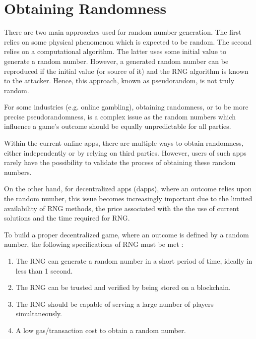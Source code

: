 \documentclass[12pt]{article}
\begin{document}

\newpage
\vspace{\baselineskip}\section{Obtaining Randomness}
\label{Obtaining Randomness}   \par

There are two main approaches used for random number generation. The first relies on some physical phenomenon which is expected to be random. The second relies on a computational algorithm. The latter uses some initial value to generate a random number. However, a generated random number can be reproduced if the initial value (or source of it) and the RNG algorithm is known to the attacker. Hence, this approach, known as pseudorandom, is not truly random.\par

For some industries (e.g. online gambling), obtaining randomness, or to be more precise pseudorandomness, is a complex issue as the random numbers which influence a game’s outcome should be equally unpredictable for all parties.\par

Within the current online apps, there are multiple ways to obtain randomness, either independently or by relying on third parties. However, users of such apps rarely have the possibility to validate the process of obtaining these random numbers.\par

On the other hand, for decentralized apps (dapps), where an outcome relies upon the random number, this issue becomes increasingly important due to the limited availability of RNG methods, the price associated with the the use of current solutions and the time required for RNG.\par

To build a proper decentralized game, where an outcome is defined by a random number, the following specifications of RNG must be met  \cite{Tomas_Draksas_2017_Aug_28}:\par

\begin{enumerate}
	\item The RNG can generate a random number in a short period of time, ideally in less than 1 second.\par

	\item The RNG can be trusted and verified by being stored on a blockchain.\par

	\item The RNG should be capable of serving a large number of players simultaneously.\par

	\item A low gas/transaction cost to obtain a random number.
\end{enumerate}\par
\end{document}
